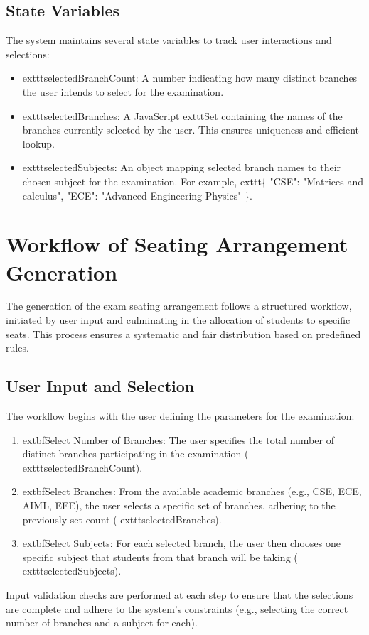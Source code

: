\documentclass{article}
\begin{document}
\subsection{State Variables}
The system maintains several state variables to track user interactions and selections:
\begin{itemize}
    \item 	exttt{selectedBranchCount}: A number indicating how many distinct branches the user intends to select for the examination.
    \item 	exttt{selectedBranches}: A JavaScript 	exttt{Set} containing the names of the branches currently selected by the user. This ensures uniqueness and efficient lookup.
    \item 	exttt{selectedSubjects}: An object mapping selected branch names to their chosen subject for the examination. For example, 	exttt{\{ "CSE": "Matrices and calculus", "ECE": "Advanced Engineering Physics" \}}.
\end{itemize}

\section{Workflow of Seating Arrangement Generation}
The generation of the exam seating arrangement follows a structured workflow, initiated by user input and culminating in the allocation of students to specific seats. This process ensures a systematic and fair distribution based on predefined rules.

\subsection{User Input and Selection}
The workflow begins with the user defining the parameters for the examination:
\begin{enumerate}
    \item 	extbf{Select Number of Branches}: The user specifies the total number of distinct branches participating in the examination (	exttt{selectedBranchCount}).
    \item 	extbf{Select Branches}: From the available academic branches (e.g., CSE, ECE, AIML, EEE), the user selects a specific set of branches, adhering to the previously set count (	exttt{selectedBranches}).
    \item 	extbf{Select Subjects}: For each selected branch, the user then chooses one specific subject that students from that branch will be taking (	exttt{selectedSubjects}).
\end{enumerate}
Input validation checks are performed at each step to ensure that the selections are complete and adhere to the system's constraints (e.g., selecting the correct number of branches and a subject for each).
\end{document}
